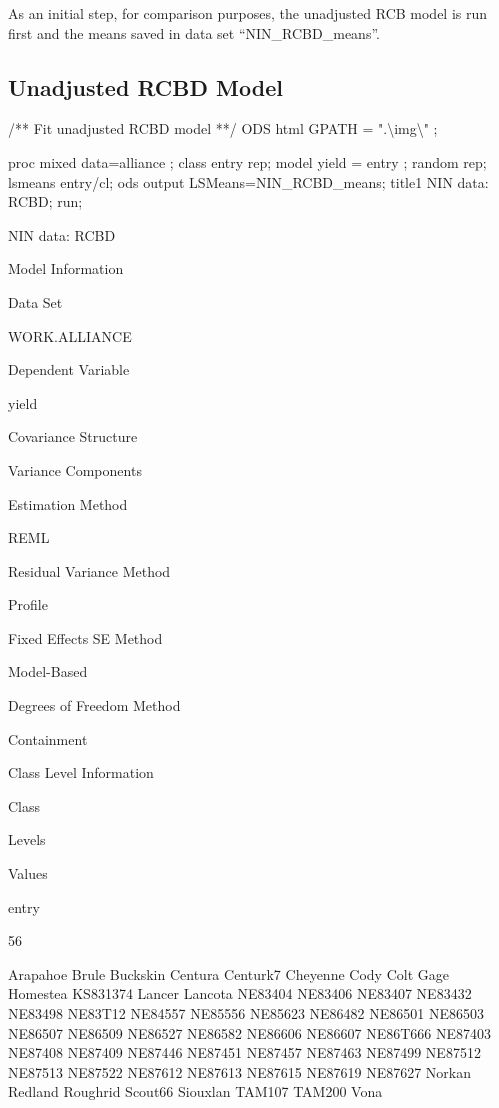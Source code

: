 \documentclass[
]{book}
\newenvironment{Shaded}{\begin{snugshade}}{\end{snugshade}}
\newcommand{\NormalTok}[1]{#1}
\begin{document}
As an initial step, for comparison purposes, the unadjusted RCB model is run first and the means saved in data set ``NIN\_RCBD\_means''.

\hypertarget{unadjusted-rcbd-model}{%
\subsection{Unadjusted RCBD Model}\label{unadjusted-rcbd-model}}

\begin{Shaded}
\begin{Highlighting}[]

\NormalTok{/** Fit unadjusted RCBD model **/}
\NormalTok{ODS html GPATH = ".\textbackslash{}img\textbackslash{}" ;}

\NormalTok{proc mixed data=alliance ;}
\NormalTok{    class entry rep;}
\NormalTok{    model yield = entry ;}
\NormalTok{    random rep;}
\NormalTok{    lsmeans entry/cl;}
\NormalTok{    ods output LSMeans=NIN\_RCBD\_means;}
\NormalTok{    title1 \textquotesingle{}NIN data: RCBD\textquotesingle{};}
\NormalTok{run;}
\end{Highlighting}
\end{Shaded}

NIN data: RCBD

Model Information

Data Set

WORK.ALLIANCE

Dependent Variable

yield

Covariance Structure

Variance Components

Estimation Method

REML

Residual Variance Method

Profile

Fixed Effects SE Method

Model-Based

Degrees of Freedom Method

Containment

Class Level Information

Class

Levels

Values

entry

56

Arapahoe Brule Buckskin Centura Centurk7 Cheyenne Cody Colt Gage Homestea KS831374 Lancer Lancota NE83404 NE83406 NE83407 NE83432 NE83498 NE83T12 NE84557 NE85556 NE85623 NE86482 NE86501 NE86503 NE86507 NE86509 NE86527 NE86582 NE86606 NE86607 NE86T666 NE87403 NE87408 NE87409 NE87446 NE87451 NE87457 NE87463 NE87499 NE87512 NE87513 NE87522 NE87612 NE87613 NE87615 NE87619 NE87627 Norkan Redland Roughrid Scout66 Siouxlan TAM107 TAM200 Vona
\end{document}
